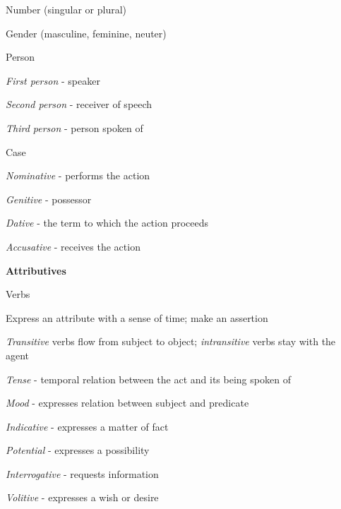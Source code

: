 \documentclass{report}
\begin{document}
\begin{outline}
\begin{outline}
\begin{outline}
\begin{outline}
        \item Number (singular or plural)
        \item Gender (masculine, feminine, neuter)
        \item Person
        \begin{outline}
          \item \textit{First person} - speaker
          \item \textit{Second person} - receiver of speech
          \item \textit{Third person} - person spoken of
        \end{outline}
        \item Case
        \begin{outline}
          \item \textit{Nominative} - performs the action
          \item \textit{Genitive} - possessor
          \item \textit{Dative} - the term to which the action proceeds
          \item \textit{Accusative} - receives the action
        \end{outline}
      \end{outline}
    \end{outline}
    \item {\bf Attributives}
      \begin{outline}
        \item Verbs
          \begin{outline}
            \item Express an attribute with a sense of time; make an assertion
            \item \textit{Transitive} verbs flow from subject to object; \textit{intransitive} verbs stay with the agent
            \item \textit{Tense} - temporal relation between the act and its being spoken of
            \item \textit{Mood} - expresses relation between subject and predicate
            \begin{outline}
              \item \textit{Indicative} - expresses a matter of fact
              \item \textit{Potential} - expresses a possibility
              \item \textit{Interrogative} - requests information
              \item \textit{Volitive} - expresses a wish or desire

\end{outline}
\end{outline}
\end{outline}
\end{outline}
\end{outline}
\end{document}
